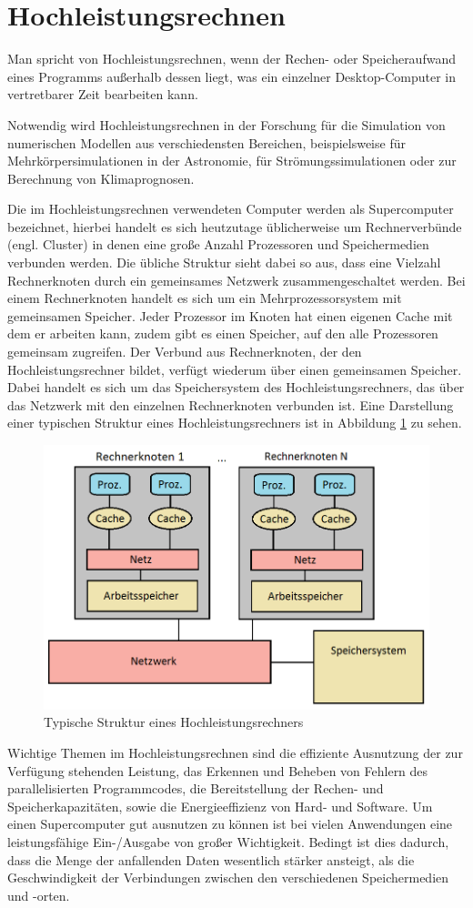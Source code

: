 \documentclass[
	twoside,
	12pt,
	a4paper,
	BCOR10mm,
	DIV14,
	listof=totoc,
	bibliography=totoc,
	headsepline
]{scrreprt}
\begin{document}
\section{Hochleistungsrechnen}
\label{back_hpc}
Man spricht von Hochleistungsrechnen, wenn der Rechen- oder Speicheraufwand eines Programms außerhalb dessen liegt, was ein einzelner Desktop-Computer in vertretbarer Zeit bearbeiten kann.

Notwendig wird Hochleistungsrechnen in der Forschung für die Simulation von numerischen Modellen aus verschiedensten Bereichen, beispielsweise für Mehrkörpersimulationen in der Astronomie, für Strömungssimulationen oder zur Berechnung von Klimaprognosen.

Die im Hochleistungsrechnen verwendeten Computer werden als Supercomputer bezeichnet, hierbei handelt es sich heutzutage üblicherweise um Rechnerverbünde (engl. Cluster) in denen eine große Anzahl Prozessoren und Speichermedien verbunden werden.
Die übliche Struktur sieht dabei so aus, dass eine Vielzahl Rechnerknoten durch ein gemeinsames Netzwerk zusammengeschaltet werden. Bei einem Rechnerknoten handelt es sich um ein Mehrprozessorsystem mit gemeinsamen Speicher. Jeder Prozessor im Knoten hat einen eigenen Cache mit dem er arbeiten kann, zudem gibt es einen Speicher, auf den alle Prozessoren gemeinsam zugreifen. 
Der Verbund aus Rechnerknoten, der den Hochleistungsrechner bildet, verfügt wiederum über einen gemeinsamen Speicher. Dabei handelt es sich um das Speichersystem des Hochleistungsrechners, das über das Netzwerk mit den einzelnen Rechnerknoten verbunden ist.
Eine Darstellung einer typischen Struktur eines Hochleistungsrechners ist in Abbildung \ref{fig:rechnerknoten} zu sehen.
\begin{figure}[h]
	\begin{center}
		\includegraphics[width=.43\textwidth]{Bilder/rechnerknoten.png}
	\end{center}
	\caption{Typische Struktur eines Hochleistungsrechners}
	\label{fig:rechnerknoten}
\end{figure}

Wichtige Themen im Hochleistungsrechnen sind die effiziente Ausnutzung der zur Verfügung stehenden Leistung, das Erkennen und Beheben von Fehlern des parallelisierten Programmcodes, die Bereitstellung der Rechen- und Speicherkapazitäten, sowie die Energieeffizienz von Hard- und Software.
Um einen Supercomputer gut ausnutzen zu können ist bei vielen Anwendungen eine leistungsfähige Ein-/Ausgabe von großer Wichtigkeit. Bedingt ist dies dadurch, dass die Menge der anfallenden Daten wesentlich stärker ansteigt, als die Geschwindigkeit der Verbindungen zwischen den verschiedenen Speichermedien und -orten.
\end{document}
